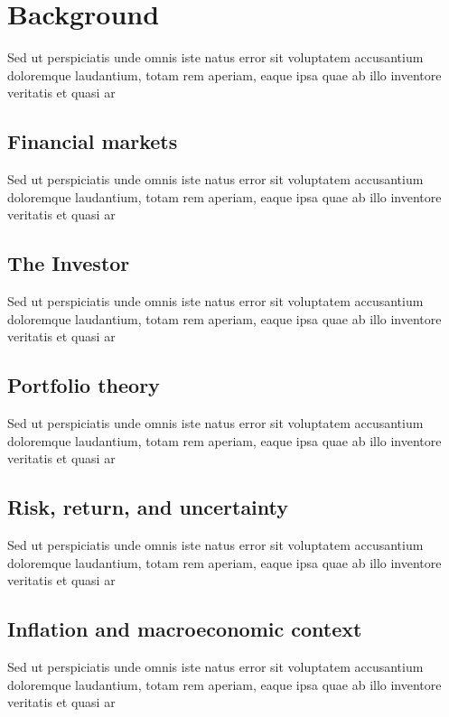 \chapter{Background}

Sed ut perspiciatis unde omnis iste natus error sit voluptatem accusantium doloremque laudantium, totam rem aperiam, eaque ipsa quae ab illo inventore veritatis et quasi ar

\section{Financial markets}

Sed ut perspiciatis unde omnis iste natus error sit voluptatem accusantium doloremque laudantium, totam rem aperiam, eaque ipsa quae ab illo inventore veritatis et quasi ar

\section{The Investor}
Sed ut perspiciatis unde omnis iste natus error sit voluptatem accusantium doloremque laudantium, totam rem aperiam, eaque ipsa quae ab illo inventore veritatis et quasi ar

\section{Portfolio theory}

Sed ut perspiciatis unde omnis iste natus error sit voluptatem accusantium doloremque laudantium, totam rem aperiam, eaque ipsa quae ab illo inventore veritatis et quasi ar

\section{Risk, return, and uncertainty}

Sed ut perspiciatis unde omnis iste natus error sit voluptatem accusantium doloremque laudantium, totam rem aperiam, eaque ipsa quae ab illo inventore veritatis et quasi ar

\section{Inflation and macroeconomic context}

Sed ut perspiciatis unde omnis iste natus error sit voluptatem accusantium doloremque laudantium, totam rem aperiam, eaque ipsa quae ab illo inventore veritatis et quasi ar

